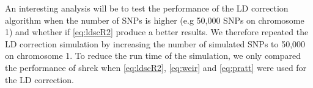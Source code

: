 \documentclass[12pt]{scrbook}
\begin{document}
An interesting analysis will be to test the performance of the \gls{LD} correction algorithm when the number of \glspl{SNP} is higher (e.g 50,000 \glspl{SNP} on chromosome 1) and whether if \cref{eq:ldscR2} produce a better results.
We therefore repeated the \gls{LD} correction simulation by increasing the number of simulated \glspl{SNP} to 50,000 on chromosome 1.
To reduce the run time of the simulation, we only compared the performance of \gls{shrek} when \cref{eq:ldscR2}, \cref{eq:weir} and \cref{eq:pratt} were used for the \gls{LD} correction.
\begin{figure}[t]
	\centering
\end{figure}
\end{document}
